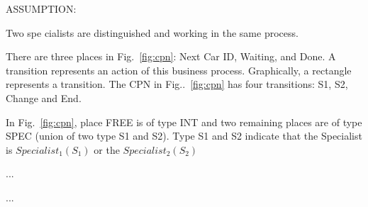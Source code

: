\documentclass[a4paper]{article}
\begin{document}
ASSUMPTION:\par
Two spe	cialists are distinguished and working in the same process.\par
There are three places in Fig.~\ref{fig:cpn}: Next Car ID, Waiting,
and Done. A transition represents an action of this business process. Graphically, a rectangle
represents a transition. The CPN in Fig..~\ref{fig:cpn} has four transitions: S1, S2, Change and End.\par
In Fig.~\ref{fig:cpn}, place FREE is of type INT and two remaining places are of type SPEC (union of two type S1 and S2). Type S1 and S2 indicate that the Specialist
is $Specialist_1(S_1)$ or the $Specialist_2(S_2)$


\newpage
\begin{thebibliography}{80}


	...


	...


\end{thebibliography}
\end{document}

